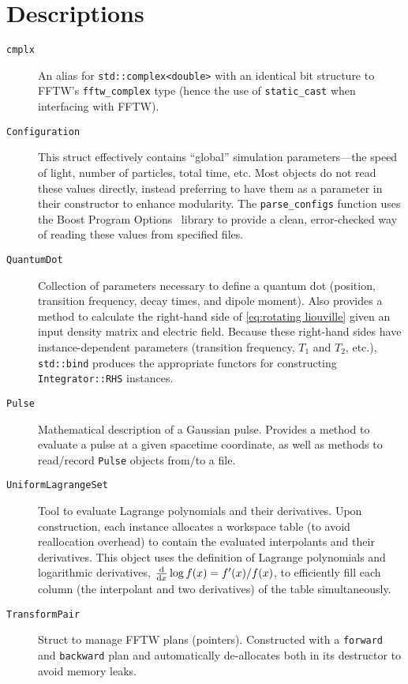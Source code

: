 \section{\label{sec:quest descriptions}Descriptions}

\begin{description}
  \item[\texttt{cmplx}] An alias for \lstinline!std::complex<double>! with an identical bit structure to FFTW's \lstinline!fftw_complex! type (hence the use of \lstinline!static_cast! when interfacing with FFTW).
  \item[\texttt{Configuration}] This struct effectively contains ``global'' simulation parameters---the speed of light, number of particles, total time, etc.
    Most objects do not read these values directly, instead preferring to have them as a parameter in their constructor to enhance modularity. 
    The \lstinline!parse_configs! function uses the Boost Program Options~\cite{boost} library to provide a clean, error-checked way of reading these values from specified files.
  \item[\texttt{QuantumDot}] Collection of parameters necessary to define a quantum dot (position, transition frequency, decay times, and dipole moment).
    Also provides a method to calculate the right-hand side of \cref{eq:rotating liouville} given an input density matrix and electric field.
    Because these right-hand sides have instance-dependent parameters (transition frequency, $T_1$ and $T_2$, etc.), \lstinline!std::bind! produces the appropriate functors for constructing \lstinline!Integrator::RHS! instances.
  \item[\texttt{Pulse}] Mathematical description of a Gaussian pulse.
    Provides a method to evaluate a pulse at a given spacetime coordinate, as well as methods to read/record \lstinline!Pulse! objects from/to a file.
  \item[\texttt{UniformLagrangeSet}] Tool to evaluate Lagrange polynomials and their derivatives.
    Upon construction, each instance allocates a workspace table (to avoid reallocation overhead) to contain the evaluated interpolants and their derivatives.
    This object uses the definition of Lagrange polynomials and logarithmic derivatives, $\dv{x} \log f(x) = f'(x)/f(x)$, to efficiently fill each column (the interpolant and two derivatives) of the table simultaneously.
  \item[\texttt{TransformPair}] Struct to manage FFTW plans (pointers). Constructed with a \lstinline!forward! and \lstinline!backward! plan and automatically de-allocates both in its destructor to avoid memory leaks.

\end{description}
